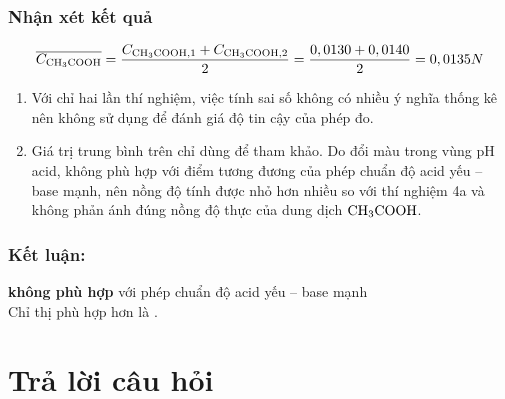     \subsubsection{Nhận xét kết quả}
        \begin{equation}
            \overline{C_{\ce{CH3COOH}}} = \frac{C_{\ce{CH3COOH}, 1} + C_{\ce{CH3COOH}, 2}}{2} = \frac{0,0130 + 0,0140}{2} = 0,0135N
        \end{equation}
        \begin{enumerate}
            \item Với chỉ hai lần thí nghiệm, việc tính sai số không có nhiều ý nghĩa thống kê nên không sử dụng để đánh giá độ tin cậy của phép đo.
            \item Giá trị trung bình trên chỉ dùng để tham khảo. Do \MethylOrangeWord{} đổi màu trong vùng pH acid, không phù hợp với điểm tương đương của phép chuẩn độ acid yếu -- base mạnh, nên nồng độ tính được nhỏ hơn nhiều so với thí nghiệm 4a và không phản ánh đúng nồng độ thực của dung dịch \(\ce{CH3COOH}\).
        \end{enumerate}
    \subsubsection{Kết luận:}
    \begin{center}
        \MethylOrangeWord{} \textbf{không phù hợp} với phép chuẩn độ acid yếu -- base mạnh\\ Chỉ thị phù hợp hơn là \textbf{\PhenolphthaleinWord}.
    \end{center}

\section{Trả lời câu hỏi}

